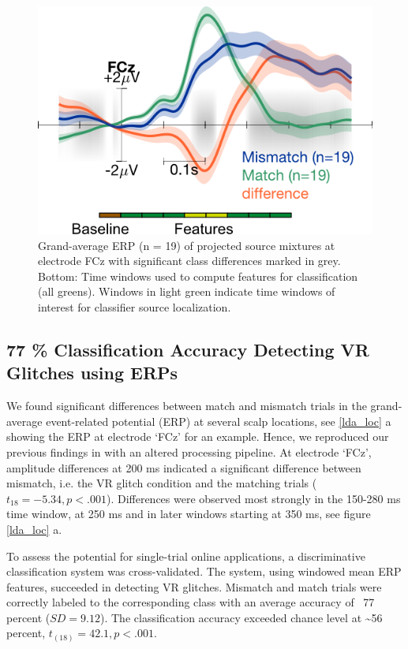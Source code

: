 
\begin{figure}[h]
  \includegraphics[width=\textwidth]{figures/erp_FCZ_diff_delay.png}
  \caption{Grand-average ERP (n = 19) of projected source mixtures at electrode FCz with significant class differences marked in grey. Bottom: Time windows used to compute features for classification (all greens). Windows in light green indicate time windows of interest for classifier source localization.}
  \label{erp}
\end{figure}

\subsection{77 \% Classification Accuracy Detecting VR Glitches using ERPs}

We found significant differences between match and mismatch trials in the grand-average event-related potential (ERP) at several scalp locations, see \ref{lda_loc} a showing the ERP at electrode `FCz' for an example. Hence, we reproduced our previous findings in \citet{Gehrke2019-og} with an altered processing pipeline. At electrode `FCz', amplitude differences at 200 ms indicated a significant difference between mismatch, i.e. the VR glitch condition and the matching trials ($t_{18} = -5.34, p < .001$). Differences were observed most strongly in the 150-280 ms time window, at 250 ms and in later windows starting at 350 ms, see figure \ref{lda_loc} a.

To assess the potential for single-trial online applications, a discriminative classification system was cross-validated. The system, using windowed mean ERP features, succeeded in detecting VR glitches. Mismatch and match trials were correctly labeled to the corresponding class with an average accuracy of ~77 percent ($SD = 9.12$). The classification accuracy exceeded chance level at \textasciitilde 56 percent, $t_{(18)} = 42.1, p < .001$. 

